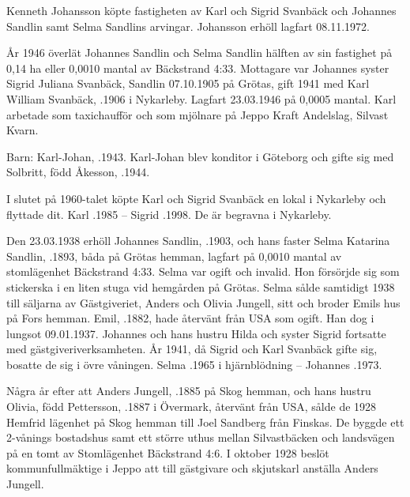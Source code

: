 Kenneth Johansson köpte fastigheten av Karl och Sigrid Svanbäck	och Johannes Sandlin samt Selma Sandlins arvingar. Johansson erhöll lagfart 08.11.1972.


År 1946 överlät Johannes Sandlin och Selma Sandlin hälften av sin	fastighet på 0,14 ha eller 0,0010 mantal av Bäckstrand 4:33. Mottagare	var Johannes syster Sigrid Juliana Svanbäck, \textborn Sandlin	07.10.1905 på Grötas, gift 1941 med Karl William Svanbäck, .1906 i Nykarleby. Lagfart 23.03.1946 på 0,0005 mantal. Karl arbetade som taxichaufför och som mjölnare på Jeppo Kraft Andelslag, Silvast Kvarn.

Barn:	Karl-Johan,	.1943.	Karl-Johan blev konditor i Göteborg och gifte sig med Solbritt, född	Åkesson, .1944.

I slutet på 1960-talet köpte Karl och Sigrid Svanbäck en lokal i Nykarleby och flyttade dit.
Karl .1985  --  Sigrid .1998. De är	begravna i Nykarleby.


Den 23.03.1938 erhöll Johannes Sandlin, .1903, och hans faster Selma Katarina Sandlin, .1893, båda på Grötas hemman, lagfart på 0,0010 mantal av stomlägenhet Bäckstrand 4:33. Selma var ogift och invalid. Hon försörjde sig som stickerska i en	liten stuga vid hemgården på Grötas. Selma sålde samtidigt 1938	till säljarna av Gästgiveriet, Anders och Olivia Jungell, sitt och broder Emils hus på Fors hemman. Emil, .1882, hade återvänt från USA som ogift. Han dog i lungsot 09.01.1937. Johannes och hans hustru Hilda och syster Sigrid fortsatte med gästgiveriverksamheten. År 1941, då Sigrid och Karl Svanbäck gifte sig, bosatte de sig i övre våningen.
Selma .1965 i hjärnblödning  --  Johannes .1973.


Några år efter att Anders Jungell, .1885 på Skog hemman,	och hans hustru Olivia, född Pettersson, .1887 i Övermark, återvänt från USA, sålde de 1928 Hemfrid lägenhet på Skog hemman till Joel Sandberg från Finskas. De byggde ett 2-vånings bostadshus samt ett	större uthus mellan Silvastbäcken och landsvägen på en tomt av Stomlägenhet Bäckstrand 4:6. I oktober 1928 beslöt kommunfullmäktige i Jeppo att till gästgivare och skjutskarl anställa Anders Jungell.

